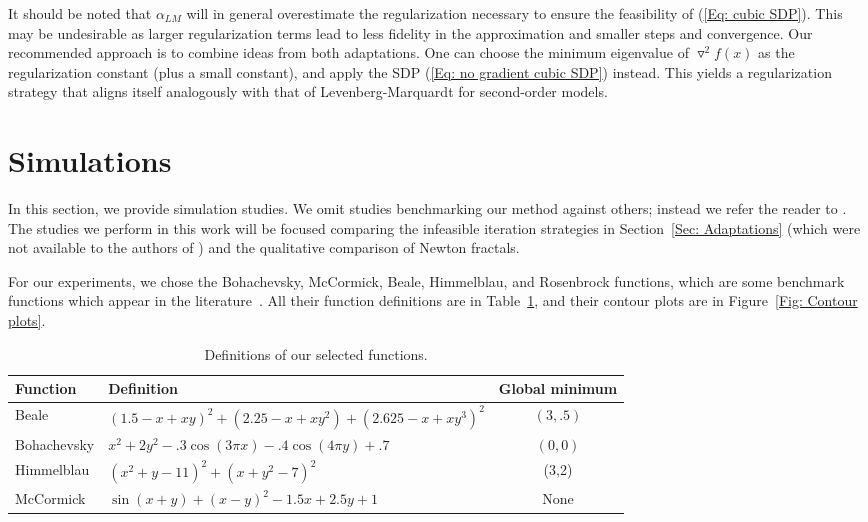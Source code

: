 \documentclass[11pt]{article}
\theoremstyle{plain}
\theoremstyle{definition}
\theoremstyle{remark}
\def \Hess{\triangledown^2}
\begin{document}
It should be noted that $\alpha_{LM}$ will in general overestimate the regularization necessary to ensure the feasibility of (\ref{Eq: cubic SDP}). This may be undesirable as larger regularization terms lead to less fidelity in the approximation and smaller steps and convergence. Our recommended approach is to combine ideas from both adaptations. One can choose the minimum eigenvalue of $\Hess f(x)$ as the regularization constant (plus a small constant), and apply the SDP (\ref{Eq: no gradient cubic SDP}) instead. This yields a regularization strategy that aligns itself analogously with that of Levenberg-Marquardt for second-order models.


\section{Simulations}\label{Sec: Simulations}

In this section, we provide simulation studies. We omit studies benchmarking our method against others; instead we refer the reader to \cite{cai2026globally}. The studies we perform in this work will be focused comparing the infeasible iteration strategies in Section~\ref{Sec: Adaptations} (which were not available to the authors of \cite{cai2026globally}) and the qualitative comparison of Newton fractals.

For our experiments, we chose the Bohachevsky, McCormick, Beale, Himmelblau, and Rosenbrock functions, which are some benchmark functions which appear in the literature~\cite{Adorio2005MVFM}. All their function definitions are in Table~\ref{Tab: Function defs}, and their contour plots are in Figure~\ref{Fig: Contour plots}.

\begin{table}[H]
\centering
\begin{tabular}{|l| l  | c |} \hline
Function & Definition & Global minimum \\\hline
Beale & $(1.5-x+xy)^2 + (2.25 - x + xy^2) + (2.625 - x + xy^3)^2$ & $(3,.5)$\\\hline
Bohachevsky & $x^2 + 2y^2 - .3\cos(3\pi x) - .4\cos (4\pi y) + .7$ & $(0,0)$\\\hline
Himmelblau & $(x^2 + y - 11)^2 + (x + y^2 - 7)^2$ & (3,2)\\\hline
McCormick & $\sin (x+y) + (x-y)^2 - 1.5x + 2.5y + 1$ & None \\\hline
\end{tabular}
\caption{Definitions of our selected functions.}
\label{Tab: Function defs}
\end{table}
\end{document}

